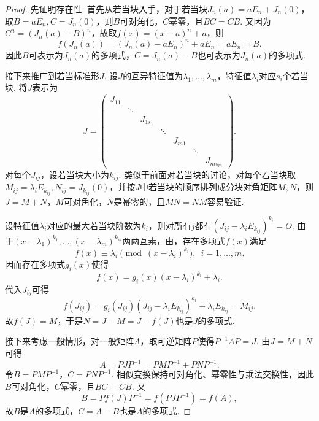 \begin{proof}
    先证明存在性. 首先从若当块入手，对于若当块$J_n(a)=aE_n+J_n(0)$，取$B=aE_n, C=J_n(0)$，则$B$可对角化，$C$幂零，且$BC=CB$. 又因为$C^n=(J_n(a)-B)^n$，故取$f(x)=(x-a)^n+a$，则
    \[
        f(J_n(a))=(J_n(a)-aE_n)^n+aE_n=aE_n=B.
    \]
    因此$B$可表示为$J_n(a)$的多项式，$C=J_n(a)-B$也可表示为$J_n(a)$的多项式.

    接下来推广到若当标准形$J$. 设$J$的互异特征值为$\lambda_1,\ldots,\lambda_m$，特征值$\lambda_i$对应$s_i$个若当块. 将$J$表示为
    \[J=\begin{pmatrix}
            J_{11} &        &          &        &        &        &          \\
                   & \ddots &          &        &        &        &          \\
                   &        & J_{1s_1} &        &        &        &          \\
                   &        &          & \ddots &        &        &          \\
                   &        &          &        & J_{m1} &        &          \\
                   &        &          &        &        & \ddots &          \\
                   &        &          &        &        &        & J_{ms_m}
        \end{pmatrix}.\]
    对每个$J_{ij}$，设若当块大小为$k_{ij}$. 类似于前面对若当块的讨论，对每个若当块取$M_{ij}=\lambda_i E_{k_{ij}}, N_{ij}=J_{k_{ij}}(0)$，并按$J$中若当块的顺序排列成分块对角矩阵$M,N$，则$J=M+N$，$M$可对角化，$N$是幂零的，且$MN=NM$容易验证.

    设特征值$\lambda_i$对应的最大若当块阶数为$k_i$，则对所有$j$都有$(J_{ij}-\lambda_iE_{k_{ij}})^{k_i}=O$. 由于$(x-\lambda_1)^{k_1},\ldots,(x-\lambda_m)^{k_m}$两两互素，由，存在多项式$f(x)$满足
    \[
        f(x)\equiv \lambda_i \pmod{(x-\lambda_i)^{k_i}},\enspace i=1,\ldots,m.
    \]
    因而存在多项式$g_i(x)$使得
    \[
        f(x)=g_i(x)(x-\lambda_i)^{k_i}+\lambda_i.
    \]
    代入$J_{ij}$可得
    \[
        f(J_{ij})=g_i(J_{ij})(J_{ij}-\lambda_iE_{k_{ij}})^{k_i}+\lambda_iE_{k_{ij}}
        =M_{ij}.
    \]
    故$f(J)=M$，于是$N=J-M=J-f(J)$也是$J$的多项式.

    接下来考虑一般情形，对一般矩阵$A$，取可逆矩阵$P$使得$P^{-1}AP=J$. 由$J=M+N$可得
    \[
        A=PJP^{-1}=PMP^{-1}+PNP^{-1}.
    \]
    令$B=PMP^{-1}$，$C=PNP^{-1}$. 相似变换保持可对角化、幂零性与乘法交换性，因此$B$可对角化，$C$幂零，且$BC=CB$. 又
    \[
        B=Pf(J)P^{-1}=f(PJP^{-1})=f(A),
    \]
    故$B$是$A$的多项式，$C=A-B$也是$A$的多项式.


\end{proof}
